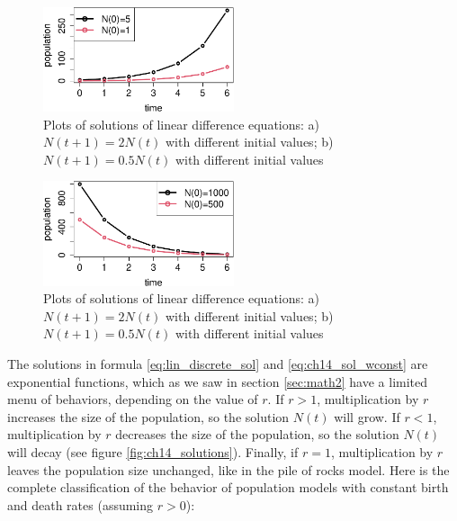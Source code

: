 \documentclass[
  letterpaper,
  DIV=11,
  numbers=noendperiod]{scrreprt}
\begin{document}
\begin{figure}[H]

{\centering \includegraphics[width=0.5\textwidth,height=\textheight]{./lindiff_files/figure-pdf/ch14-sol-1.pdf}

}

\caption{Plots of solutions of linear difference equations: a)
\(N(t+1) = 2N(t)\) with different initial values; b)
\(N(t+1) = 0.5N(t)\) with different initial values}

\end{figure}

\begin{figure}[H]

{\centering \includegraphics[width=0.5\textwidth,height=\textheight]{./lindiff_files/figure-pdf/ch14-sol-2.pdf}

}

\caption{Plots of solutions of linear difference equations: a)
\(N(t+1) = 2N(t)\) with different initial values; b)
\(N(t+1) = 0.5N(t)\) with different initial values}

\end{figure}

The solutions in formula \ref{eq:lin_discrete_sol} and
\ref{eq:ch14_sol_wconst} are exponential functions, which as we saw in
section \ref{sec:math2} have a limited menu of behaviors, depending on
the value of \(r\). If \(r > 1\), multiplication by \(r\) increases the
size of the population, so the solution \(N(t)\) will grow. If
\(r < 1\), multiplication by \(r\) decreases the size of the population,
so the solution \(N(t)\) will decay (see figure
\ref{fig:ch14_solutions}). Finally, if \(r=1\), multiplication by \(r\)
leaves the population size unchanged, like in the pile of rocks model.
Here is the complete classification of the behavior of population models
with constant birth and death rates (assuming \(r>0\)):
\end{document}
